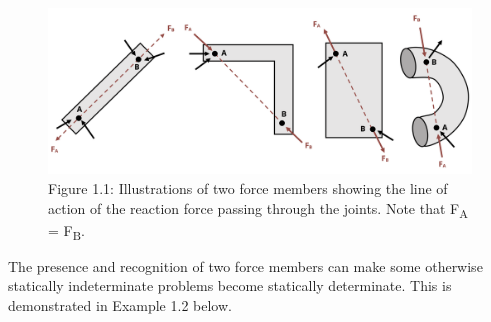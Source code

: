 \documentclass[
  letterpaper,
  DIV=11,
  numbers=noendperiod]{scrreprt}
\theoremstyle{definition}
\theoremstyle{remark}
\begin{document}
\begin{figure}[H]

{\centering \includegraphics[width=6.6875in,height=\textheight]{images/CH1 PNGs/figure 1.1.png}

}

\caption{Figure 1.1: Illustrations of two force members showing the line
of action of the reaction force passing through the joints. Note that
F\textsubscript{A} = F\textsubscript{B}.}

\end{figure}%

The presence and recognition of two force members can make some
otherwise statically indeterminate problems become statically
determinate. This is demonstrated in Example 1.2 below.
\end{document}
